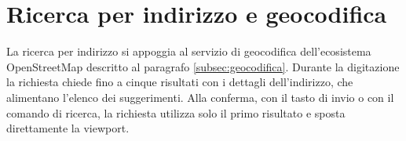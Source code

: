 %
%

\section{Ricerca per indirizzo e geocodifica}\label{subsec:impl-ricerca}

La ricerca per indirizzo si appoggia al servizio di geocodifica dell'ecosistema OpenStreetMap descritto al
paragrafo \ref{subsec:geocodifica}. %
Durante la digitazione la richiesta chiede fino a cinque risultati con i dettagli dell'indirizzo, che alimentano l'elenco
dei suggerimenti.
Alla conferma, con il tasto di invio o con il comando di ricerca, la richiesta utilizza
solo il primo risultato e sposta direttamente la viewport.

